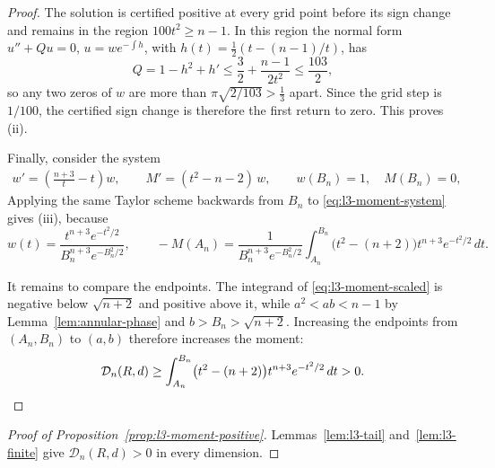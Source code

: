 \documentclass[11pt]{article}
\numberwithin{equation}{section}
\theoremstyle{definition}
\begin{document}
\begin{proof}
The solution is certified positive at every grid point before its sign
change and remains in the region $100t^2\geq n-1$. In this region the
normal form $u''+Qu=0$, $u=we^{-\int h}$, with
$h(t)=\frac12(t-(n-1)/t)$, has
\[
    Q=1-h^2+h'\leq\frac32+\frac{n-1}{2t^2}\leq\frac{103}{2},
\]
so any two zeros of $w$ are more than $\pi\sqrt{2/103}>\frac13$ apart.
Since the grid step is $1/100$, the certified sign change is therefore the
first return to zero. This proves (ii).

Finally, consider the system
\begin{equation}\label{eq:l3-moment-system}
\begin{aligned}
    w'=\left(\frac{n+3}{t}-t\right)w,
    \qquad
    M'=(t^2-n-2)\,w,
    \qquad
    w(B_n)=1,\quad M(B_n)=0,
\end{aligned}
\end{equation}
Applying the same Taylor scheme backwards from $B_n$ to
\eqref{eq:l3-moment-system} gives (iii), because
\[
    w(t)=\frac{t^{n+3}e^{-t^2/2}}{B_n^{n+3}e^{-B_n^2/2}},
    \qquad
    -M(A_n)=\frac{1}{B_n^{n+3}e^{-B_n^2/2}}
    \int_{A_n}^{B_n}\bigl(t^2-(n+2)\bigr)
    t^{n+3}e^{-t^2/2}\,dt.
\]

It remains to compare the endpoints. The integrand of
\eqref{eq:l3-moment-scaled} is negative below $\sqrt{n+2}$ and positive
above it, while $a^2<ab<n-1$ by Lemma~\ref{lem:annular-phase} and
$b>B_n>\sqrt{n+2}$. Increasing the endpoints from $(A_n,B_n)$ to $(a,b)$ therefore increases the moment:
\[
    \mathcal D_n(R,d)\geq
    \int_{A_n}^{B_n}\bigl(t^2-(n+2)\bigr)
    t^{n+3}e^{-t^2/2}\,dt>0. \qedhere
\]
\end{proof}

\begin{proof}[Proof of Proposition~\ref{prop:l3-moment-positive}]
Lemmas~\ref{lem:l3-tail} and~\ref{lem:l3-finite} give
$\mathcal D_n(R,d)>0$ in every dimension.
\end{proof}
\end{document}
